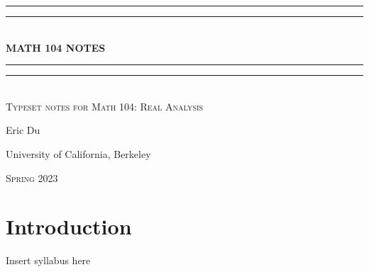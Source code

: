 \documentclass{book}
\begin{document}
    \begin{titlepage}
        \centering
        \vspace*{\baselineskip}\vspace{200pt}
        \rule{\textwidth}{1.6pt}\vspace*{-\baselineskip}\vspace*{2pt}
        \rule{\textwidth}{0.4pt}\\[\baselineskip]
        {\Huge \bfseries \MakeUppercase{Math 104} NOTES}\\[0.2\baselineskip]
        \rule{\textwidth}{0.4pt}\vspace*{-\baselineskip}\vspace{3.2pt}
        \rule{\textwidth}{1.6pt}\\[\baselineskip]
        \scshape
        Typeset notes for Math 104: Real Analysis\\
        \par
        \vspace*{2pt}
        {\Large Eric Du}\\
        {\large University of California, Berkeley\par}
        {\scshape Spring 2023} \\
    \end{titlepage}
    \setcounter{chapter}{-1}


    \chapter{Introduction}

    Insert syllabus here

    

    
\end{document}
